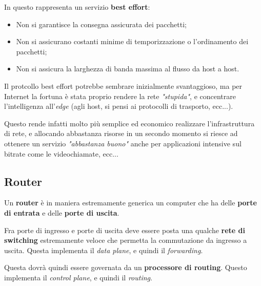 \documentclass[a4paper,11pt]{article}
\begin{document}
In questo rappresenta un servizio \textbf{best effort}:
\begin{itemize}
	\item Non si garantisce la consegna assicurata dei pacchetti;
	\item Non si assicurano costanti minime di temporizzazione o l'ordinamento dei pacchetti;
	\item Non si assicura la larghezza di banda massima al flusso da host a host. 
\end{itemize}

Il protcollo best effort potrebbe sembrare inizialmente svantaggioso, ma per Internet la fortuna è stata proprio rendere la rete \textit{"stupida"}, e concentrare l'intelligenza all'\textit{edge} (agli host, si pensi ai protocolli di trasporto, ecc...).

Questo rende infatti molto più semplice ed economico realizzare l'infrastruttura di rete, e allocando abbastanza risorse in un secondo momento si riesce ad ottenere un servizio \textit{"abbastanza buono"} anche per applicazioni intensive sul bitrate come le videochiamate, ecc...

\subsection{Router}
Un \textbf{router} è in maniera estremamente generica un computer che ha delle \textbf{porte di entrata} e delle \textbf{porte di uscita}.

Fra porte di ingresso e porte di uscita deve essere posta una qualche \textbf{rete di switching} estremamente veloce che permetta la commutazione da ingresso a uscita. Questa implementa il \textit{data plane}, e quindi il \textit{forwarding}.

Questa dovrà quindi essere governata da un \textbf{processore di routing}. Questo implementa il \textit{control plane}, e quindi il \textit{routing}.
\end{document}
